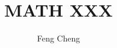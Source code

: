 \documentclass[11pt]{article}
\author{Feng Cheng}
\title{MATH XXX}
\begin{document}
\Blindtext\Blindtext
\end{document}
